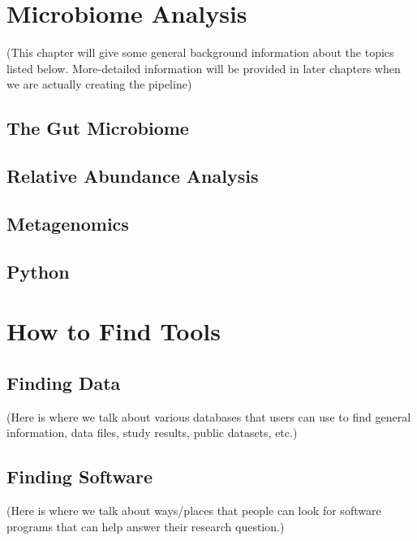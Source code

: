 \chapter{Microbiome Analysis}
(This chapter will give some general background information about the topics listed below. More-detailed information will be provided in later chapters when we are actually creating the pipeline)
\section{The Gut Microbiome}
\section{Relative Abundance Analysis}
\section{Metagenomics}
\section{Python}

\chapter{How to Find Tools}
\section{Finding Data}
(Here is where we talk about various databases that users can use to find general information, data files, study results, public datasets, etc.)
\section{Finding Software}
(Here is where we talk about ways/places that people can look for software programs that can help answer their research question.)

